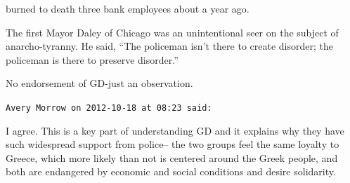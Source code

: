 \begin{footnotesize}
\begin{sffamily}
burned to death three bank employees about a year ago.

The first Mayor Daley of Chicago was an unintentional seer on the subject of anarcho-tyranny. He said, ``The policeman isn't there to create disorder; the policeman is there to preserve disorder.''

No endorsement of GD-just an observation.

\hfill

\texttt{Avery Morrow on 2012-10-18 at 08:23 said:}

I agree. This is a key part of understanding GD and it explains why they have such widespread support from police-- the two groups feel the same loyalty to Greece, which more likely than not is centered around the Greek people, and both are endangered by economic and social conditions and desire solidarity.


\hfill

\end{sffamily}
\end{footnotesize}


